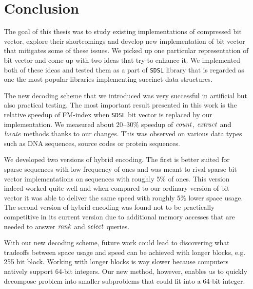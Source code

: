 \chapter*{Conclusion}  %

The goal of this thesis was to study existing implementations of compressed
bit vector, explore their shortcomings and develop new implementation of bit
vector that mitigates some of these issues. We picked up one particular
representation of bit vector and come up with two ideas that try to enhance
it. We implemented both of these ideas and tested them as a part of \texttt{SDSL}
library that is regarded as one the most popular libraries implementing succinct
data structures.

The new decoding scheme that we introduced was very successful in artificial
but also practical testing. The most important result presented in this work
is the relative speedup of FM-index when \texttt{SDSL} bit vector is replaced
by our implementation. We measured about 20--30\% speedup of $\mathit{count}$,
$\mathit{extract}$ and $\mathit{locate}$ methods thanks to our changes. This was observed
on various data types such as DNA sequences, source codes or protein sequences.

We developed two versions of hybrid encoding. The first is better suited for
sparse sequences with low frequency of ones and was meant to rival sparse bit
vector implementations on sequences with roughly 5\% of ones. This version indeed
worked quite well and when compared to our ordinary version of bit vector it was
able to deliver the same speed with roughly 5\% lower space usage.
The second version of hybrid encoding was found not to be practically competitive
in its current version due to additional memory accesses that are needed to answer
$\mathit{rank}$ and $\mathit{select}$ queries. 

With our new decoding scheme, future work could lead to discovering what tradeoffs
between space usage and speed can be achieved with longer blocks, e.g. 255 bit block.
Working with longer blocks is way slower because computers natively support 64-bit
integers. Our new method, however, enables us to quickly decompose problem into smaller
subproblems that could fit into a 64-bit integer.


